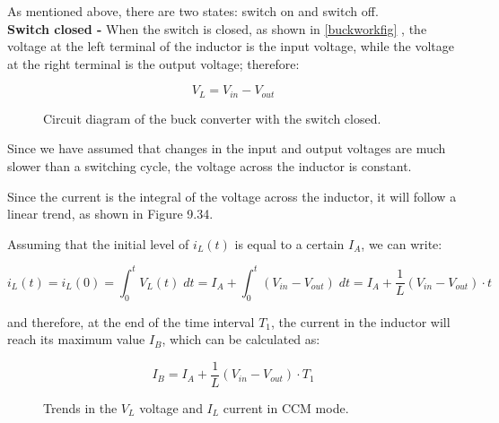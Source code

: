 \documentclass[../main.tex]{subfiles}
\begin{document}
As mentioned above, there are two states: switch on and switch off.\\

\textbf{Switch closed -} When the switch is closed, as shown in \autoref{buckworkfig} , the
voltage at the left terminal of the inductor is the input voltage, while
the voltage at the right terminal is the output voltage; therefore:

\begin{equation}
	V_L = V_{in} - V_{out}
\end{equation}


\begin{figure}[h!]
\begin{center}



\label{buckworkfig}
\caption{Circuit diagram of the buck converter with the switch closed.}	
\end{center}	
\end{figure}


Since we have assumed that changes in the input and output voltages are much slower than a switching cycle, the voltage across the inductor is constant. 

Since the current is the integral of the voltage across the inductor, it will follow a linear trend, as shown in Figure 9.34.

Assuming that the initial level of $i_L(t)$ is equal to a certain $I_A$, we can write:

\begin{equation}
	i_L(t) = i_L(0) = \int_0^t V_L(t) \;dt = I_A + \int_0^t (V_{in} - V_{out})\;dt = I_A + \frac{1}{L} (V_{in} - V_{out}) \cdot t
\end{equation}

and therefore, at the end of the time interval $T_1$, the current in the inductor will reach its maximum value $I_B$, which can be calculated as:

\begin{equation}
	I_B = I_A + \frac{1}{L} (V_{in} - V_{out}) \cdot T_1
\end{equation}


\begin{figure}[h!]
\begin{center}



\label{currentvoltagebuck}
\caption{Trends in the $V_L$ voltage and $I_L$ current in CCM mode.}	
\end{center}	
\end{figure}
\end{document}

